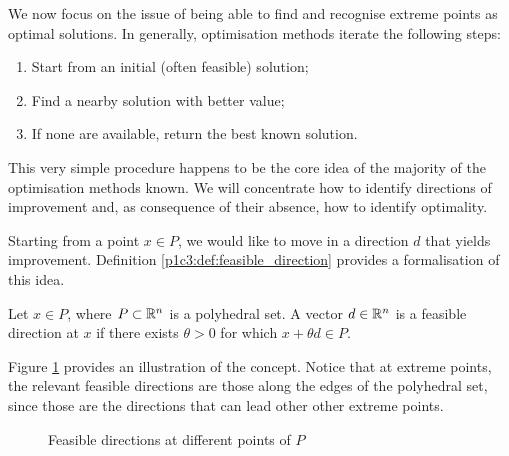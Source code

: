 We now focus on the issue of being able to find and recognise extreme points as optimal solutions. In generally, optimisation methods iterate the following steps:
%
\begin{enumerate}
	\item Start from an initial (often feasible) solution;
	\item Find a nearby solution with better value;
	\item If none are available, return the best known solution.	
\end{enumerate}
%
This very simple procedure happens to be the core idea of the majority of the optimisation methods known. We will concentrate how to identify directions of improvement and, as consequence of their absence, how to identify optimality.

Starting from a point $x \in P$, we would like to move in a direction $d$ that yields improvement. Definition \ref{p1c3:def:feasible_direction} provides a formalisation of this idea.

\begin{definition} \label{p1c3:def:feasible_direction}
	Let $x \in P$, where $P \subset \mathbb{R}^n$ is a polyhedral set. A vector $d \in \mathbb{R}^n$ is a feasible direction at $x$ if there exists $\theta > 0$ for which $x + \theta d \in P$.
\end{definition}

Figure \ref{p1c3:fig:feasible_directions} provides an illustration of the concept. Notice that at extreme points, the relevant feasible directions are those along the edges of the polyhedral set, since those are the directions that can lead other other extreme points.
  
\begin{figure}
	\caption{Feasible directions at different points of $P$} \label{p1c3:fig:feasible_directions}
\end{figure}

